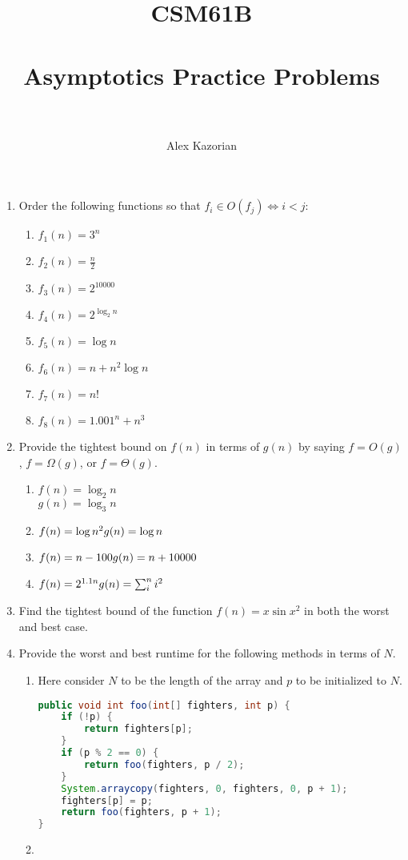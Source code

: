 \documentclass{article}
\title{
	\normalfont \normalsize
	\textsc{CSM61B} \\ [25pt] %
	\horrule{0.5pt} \\[0.4cm] %
	\huge Asymptotics Practice Problems \\ %
	\horrule{2pt} \\[0.5cm] %
}
\author{Alex Kazorian} %
\newenvironment{Questions}[1][Question]
{\begin{enumerate}}
	{\end{enumerate}}
\newcommand{\Question}{\item }
\begin{document}
	\maketitle
	\begin{Questions}
	    \Question
        Order the following functions so that $f_i \in O(f_j) \Longleftrightarrow i < j$:
            \begin{enumerate}
                \item $f_1(n) = 3^n$
                \item $f_2(n) = \frac n 2$
                \item $f_3(n) = 2^10000$
                \item $f_4(n) = 2^{\log_2 n}$
                \item $f_5(n) = \log n$
                \item $f_6(n) = n + n^2 \log n$
                \item $f_7(n) = n!$
                \item $f_8(n) = 1.001^n + n^3$
            \end{enumerate}

        \Question
        Provide the tightest bound on $f(n)$ in terms of $g(n)$ by saying $f = O(g)$, $f = \Omega(g)$, or $f = \Theta(g)$.
            \begin{enumerate}
                \item $f(n) = \log_2 n$ \\
                      $g(n) = \log_3 n$
                \item $f(n) = \log n^2 \\
                       g(n) = \log n$
                \item $f(n) = n - 100 \\
                       g(n) = n + 10000$
                \item $f(n) = 2^{1.1n} \\
                       g(n) = \sum_i^n i^2$
            \end{enumerate}

        \Question
        Find the tightest bound of the function $f(n) = x \sin x^2$ in both the worst and best case.

        \Question
		Provide the worst and best runtime for the following methods in terms of $N$.
			\begin{enumerate}
				\item
				Here consider $N$ to be the length of the array and $p$ to be initialized to $N$.
				\begin{lstlisting}[language=Java]
public void int foo(int[] fighters, int p) {
	if (!p) {
		return fighters[p];
	}
	if (p % 2 == 0) {
		return foo(fighters, p / 2);
	}
	System.arraycopy(fighters, 0, fighters, 0, p + 1);
	fighters[p] = p;
	return foo(fighters, p + 1);
}
			\end{lstlisting}
				\item
			\end{enumerate}

	\end{Questions}
\end{document}
